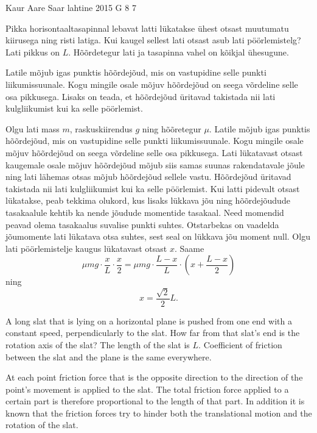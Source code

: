 {Kaur Aare Saar} %
{lahtine} %
{2015} %
{G 8} %
{7} %
{
\ifStatement
Pikka horisontaaltasapinnal lebavat latti lükatakse ühest otsast muutumatu kiirusega ning risti latiga. Kui kaugel sellest lati otsast asub lati pöörlemistelg? Lati pikkus on $L$. Hõõrdetegur lati ja tasapinna vahel on kõikjal ühesugune.
\fi


\ifHint
Latile mõjub igas punktis hõõrdejõud, mis on vastupidine selle punkti liikumissuunale. Kogu mingile osale mõjuv hõõrdejõud on seega võrdeline selle osa pikkusega. Lisaks on teada, et hõõrdejõud üritavad takistada nii lati kulgliikumist kui ka selle pöörlemist.
\fi


\ifSolution
Olgu lati mass $m$, raskuskiirendus $g$ ning hõõretegur $\mu$. Latile mõjub igas punktis hõõrdejõud, mis on vastupidine selle punkti liikumissuunale. Kogu mingile osale mõjuv hõõrdejõud on seega võrdeline selle osa pikkusega. Lati lükatavast otsast kaugemale osale mõjuv hõõrdejõud mõjub siis samas suunas rakendatavale jõule ning lati lähemas otsas mõjub hõõrdejõud sellele vastu. Hõõrdejõud üritavad takistada nii lati kulgliikumist kui ka selle pöörlemist. Kui latti pidevalt otsast lükatakse, peab tekkima olukord, kus lisaks lükkava jõu ning hõõrdejõudude tasakaalule kehtib ka nende jõudude momentide tasakaal. Need momendid peavad olema tasakaalus suvalise punkti suhtes. Otstarbekas on vaadelda jõumomente lati lükatava otsa suhtes, sest seal on lükkava jõu moment null. Olgu lati pöörlemistelje kaugus lükatavast otsast $x$. Saame
\[
\mu mg \cdot \frac{x}{L} \cdot \frac{x}{2}=\mu mg \cdot \frac{L-x}{L} \cdot \left(x+\frac{L-x}{2}\right)
\]
ning
\[
x=\frac{\sqrt{2}}{2}L.
\]
\fi


\ifEngStatement
A long slat that is lying on a horizontal plane is pushed from one end with a constant speed, perpendicularly to the slat. How far from that slat’s end is the rotation axis of the slat? The length of the slat is $L$. Coefficient of friction between the slat and the plane is the same everywhere.
\fi


\ifEngHint
At each point friction force that is the opposite direction to the direction of the point’s movement is applied to the slat. The total friction force applied to a certain part is therefore proportional to the length of that part. In addition it is known that the friction forces try to hinder both the translational motion and the rotation of the slat.
\fi


}
